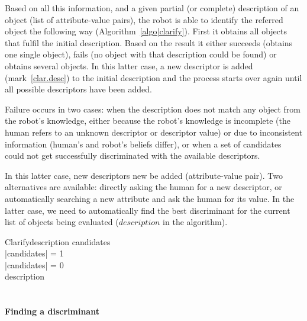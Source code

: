Based on all this information, and a given partial (or complete) description of
an object (list of attribute-value pairs), the robot is able to identify the
referred object the following way (Algorithm~\ref{algo|clarify}). First it
obtains all objects that fulfil the initial description. Based on the result
it either succeeds (obtains one single object), fails (no object with that
description could be found) or obtains several objects. In this latter case, a
new descriptor is added (mark~\ref{clar.desc}) to the initial description and
the process starts over again until all possible descriptors have been added.

Failure occurs in two cases: when the description does not match any object
from the robot's knowledge, either because the robot's knowledge is incomplete
(the human refers to an unknown descriptor or descriptor value) or due to
inconsistent information (human's and robot's beliefs differ), or when a set of
candidates could not get successfully discriminated with the available
descriptors.

In this latter case, new descriptors new be added (attribute-value pair). Two
alternatives are available: directly asking the human for a new descriptor, or
automatically searching a new attribute and ask the human for its value. In the
latter case, we need to automatically find the best discriminant for the
current list of objects being evaluated ($description$ in the algorithm).


\small
\begin{pseudocode}[ruled]{Clarify}{description}
\label{algo|clarify}
\BEGIN
candidates \GETS {} \\
\IF \left|{candidates}\right| = 1 \THEN {} \\
\ELSEIF \left|{candidates}\right| = 0 \THEN {} \\
\ELSE
    \BEGIN
        description \GETS {} \\
         \\
    \END
\END

\end{pseudocode}
\normalsize

\paragraph{Finding a discriminant}
\label{sect|discriminant}

